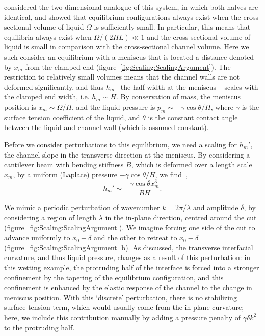 \documentclass{jfm}
\newcommand{\amplitude}{\delta} %
\begin{document}
\citet{Taroni2012JFM} considered the two-dimensional analogue of this system, in which both halves are identical, and showed that equilibrium configurations always exist when the cross-sectional volume of liquid $\Omega$ is sufficiently small. In particular, this means that equilibria always exist when $\Omega / (2HL) \ll 1$ and the cross-sectional volume of liquid is small in comparison with the cross-sectional channel volume. Here we such consider an equilibrium with a meniscus that is located a distance denoted by $x_m$ from the clamped end (figure~\ref{fig:Scaling:ScalingArgument}). The restriction to relatively small volumes means that the channel walls are not deformed significantly, and thus $h_m$ --the half-width at the meniscus -- scales with the clamped end width, i.e. $h_m \sim H$. By conservation of mass, the meniscus position is $x_m \sim \Omega / H$, and the liquid pressure is $p_m \sim -\gamma \cos \theta/H$, where $\gamma$ is the surface tension coefficient of the liquid, and $\theta$ is the constant contact angle between the liquid and channel wall (which is assumed constant).

Before we consider perturbations to this equilibrium, we need a scaling for $h_m'$, the channel slope in the transverse direction at the meniscus. By considering a cantilever beam with bending stiffness $B$, which is deformed over a length scale $x_m$, by a uniform (Laplace) pressure $-\gamma \cos \theta / H$, we find~\citep{Timoshenko1959},
\begin{equation}\label{E:Scaling:hmprimed}
h_m' \sim -\frac{\gamma \cos \theta x_m^3}{B H}.
\end{equation}

We mimic a periodic perturbation of wavenumber $k = 2\pi/\lambda$ and amplitude $\amplitude$, by considering a region of length $\lambda$ in the in-plane direction, centred around the cut (figure~\ref{fig:Scaling:ScalingArgument}). We imagine forcing one side of the cut to advance uniformly to $x_0 + \amplitude$ and the other to retreat to $x_0 - \amplitude$ (figure~\ref{fig:Scaling:ScalingArgument} b). As discussed, the transverse interfacial curvature, and thus liquid pressure, changes as a result of this perturbation: in this wetting example, the protruding half of the interface is forced into a stronger confinement by the tapering of the equilibrium configuration, and this confinement is enhanced by the elastic response of the channel to the change in meniscus position. With this `discrete' perturbation, there is no stabilizing surface tension term, which would usually come from the in-plane curvature; here, we include this contribution manually by adding a pressure penalty of $\gamma \delta k^2$ to the protruding half.
\end{document}
